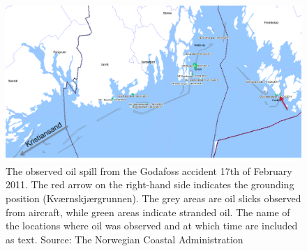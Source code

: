 \begin{figure}[htb]
	\centerline{ \includegraphics*[width=1.0\textwidth]{Figurer/Godafoss} }
	\caption{\small The observed oil spill from the Godafoss accident 17th of February 2011. The red arrow on the right-hand side indicates the grounding position (Kv{\ae}rnskj{\ae}rgrunnen). The grey areas are oil slicks observed from aircraft, while green areas indicate stranded oil. The name of the locations where oil was observed and at which time are included as text. Source: The Norwegian Coastal Administration}
	\label{fig:godafoss_oil}
\end{figure}


